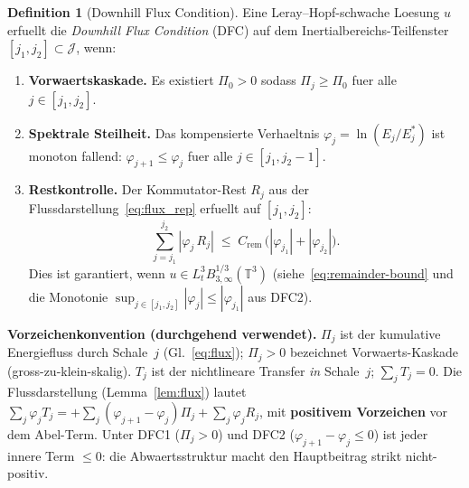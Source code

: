 \documentclass[12pt,a4paper]{article}
\theoremstyle{definition}
\newtheorem{definition}{Definition}[section]
\theoremstyle{plain}
\theoremstyle{remark}
\begin{document}
\begin{definition}[Downhill Flux Condition]\label{def:DFC}
Eine Leray--Hopf-schwache Loesung $u$ erfuellt die \emph{Downhill Flux
Condition} (DFC) auf dem Inertialbereichs-Teilfenster
$[j_1, j_2] \subset \mathcal{J}$, wenn:
\begin{enumerate}
  \item[\textup{(DFC1)}] \textbf{Vorwaertskaskade.}\;
    Es existiert $\Pi_0 > 0$ sodass
    $\Pi_j \ge \Pi_0$ fuer alle $j \in [j_1, j_2]$.
  \item[\textup{(DFC2)}] \textbf{Spektrale Steilheit.}\;
    Das kompensierte Verhaeltnis $\varphi_j = \ln(E_j/E_j^*)$ ist
    monoton fallend:
    $\varphi_{j+1} \le \varphi_j$ fuer alle $j \in [j_1, j_2-1]$.
  \item[\textup{(DFC3)}] \textbf{Restkontrolle.}\;
    Der Kommutator-Rest $R_j$ aus der
    Flussdarstellung~\eqref{eq:flux_rep} erfuellt auf $[j_1, j_2]$:
    \begin{equation}\label{eq:DFC3-concrete}
      \sum_{j=j_1}^{j_2} |\varphi_j\,R_j|
      \;\le\;
      C_{\mathrm{rem}}\,
      \bigl(|\varphi_{j_1}| + |\varphi_{j_2}|\bigr).
    \end{equation}
    Dies ist garantiert, wenn
    $u \in L^3_t B^{1/3}_{3,\infty}(\mathbb{T}^3)$
    (siehe~\eqref{eq:remainder-bound} und die Monotonie
    $\sup_{j \in [j_1,j_2]}|\varphi_j| \le |\varphi_{j_1}|$
    aus DFC2).
\end{enumerate}
\end{definition}

\noindent
\textbf{Vorzeichenkonvention (durchgehend verwendet).}\;
$\Pi_j$ ist der kumulative Energiefluss durch Schale~$j$
(Gl.~\eqref{eq:flux}); $\Pi_j > 0$ bezeichnet Vorwaerts-Kaskade
(gross-zu-klein-skalig). $T_j$ ist der nichtlineare Transfer \emph{in}
Schale~$j$; $\sum_j T_j = 0$. Die Flussdarstellung
(Lemma~\ref{lem:flux}) lautet
$\sum_j \varphi_j T_j = +\sum_j(\varphi_{j+1}-\varphi_j)\Pi_j +
\sum_j \varphi_j R_j$, mit \textbf{positivem Vorzeichen} vor dem
Abel-Term. Unter DFC1 ($\Pi_j > 0$) und DFC2 ($\varphi_{j+1} - \varphi_j
\le 0$) ist jeder innere Term $\le 0$: die Abwaertsstruktur macht den
Hauptbeitrag strikt nicht-positiv.
\end{document}
